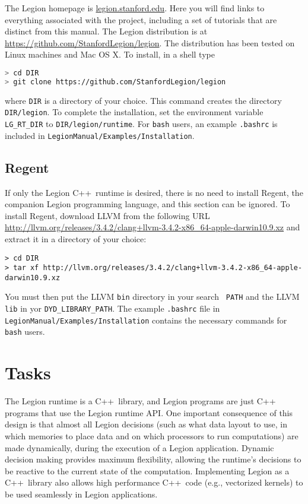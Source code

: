 \documentclass[11pt]{book}
\newcommand{\legionbook}[1]{{\tt LegionManual/Examples/#1}}
\newcommand{\Cpp}{C++}
\begin{document}
The Legion homepage is \url{legion.stanford.edu}.  Here you will find
links to everything associated with the project, including a set of
tutorials that are distinct from this manual.  The Legion distribution is at
\url{https://github.com/StanfordLegion/legion}.  The distribution has been
tested on Linux machines and Mac OS X.  To install, in a shell type
\begin{lstlisting}[language=bash]
> cd DIR
> git clone https://github.com/StanfordLegion/legion
\end{lstlisting}
where {\tt DIR} is a directory of your choice.  This command creates 
the directory {\tt DIR/legion}.  To complete the installation,
set the environment variable {\tt LG\_RT\_DIR} to {\tt DIR/legion/runtime}.
For {\tt bash} users, an example {\tt .bashrc} is included in
\legionbook{Installation}.

\section{Regent}

If only the Legion \Cpp\ runtime is desired, there is no need to install Regent, the companion
Legion programming language, and this section can be ignored.  To install Regent, download LLVM
from the following URL
{\small\url{http://llvm.org/releases/3.4.2/clang+llvm-3.4.2-x86_64-apple-darwin10.9.xz}}
and extract it in a directory of your choice:
{\small
\begin{verbatim}
> cd DIR
> tar xf http://llvm.org/releases/3.4.2/clang+llvm-3.4.2-x86_64-apple-darwin10.9.xz
\end{verbatim}
}
You must then put the LLVM {\tt bin} directory in your search {\tt
  PATH} and the LLVM {\tt lib} in yor {\tt DYD\_LIBRARY\_PATH}.  The
example {\tt .bashrc} file in \legionbook{Installation} contains the
necessary commands for {\tt bash} users.



\chapter{Tasks}
\label{chap:tasks}

The Legion runtime is a \Cpp\ library, and
Legion programs are just C++ programs that use the Legion runtime API.
One important consequence of this design is that almost all Legion decisions
(such as what data layout to use, in which memories to place data and on which
processors to run computations) are made dynamically,  during the execution of 
a Legion application.  Dynamic decision making provides maximum flexibility, 
allowing the runtime's decisions to be reactive to the current state of the computation.
Implementing Legion as a \Cpp\ library also allows high performance \Cpp\ code
(e.g., vectorized kernels) to be used seamlessly in Legion applications.
\end{document}
